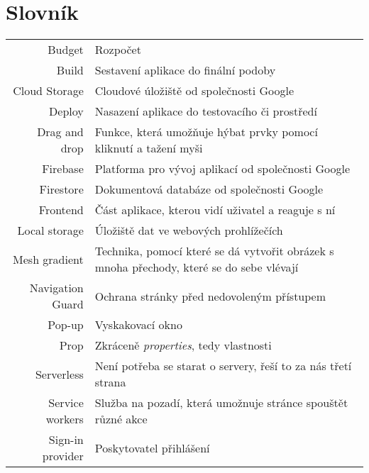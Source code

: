
\chapter{Slovník}

\begin{tabular}{rl}
    Budget & Rozpočet \\
    Build & Sestavení aplikace do finální podoby \\
    Cloud Storage & Cloudové úložiště od společnosti Google \\
    Deploy & Nasazení aplikace do testovacího či prostředí \\
    Drag and drop & Funkce, která umožňuje hýbat prvky pomocí kliknutí a tažení myši \\
    Firebase & Platforma pro vývoj aplikací od společnosti Google \\
    Firestore & Dokumentová databáze od společnosti Google \\
    Frontend & Část aplikace, kterou vidí uživatel a reaguje s ní \\
    Local storage & Úložiště dat ve webových prohlížečích \\
    Mesh gradient & Technika, pomocí které se dá vytvořit obrázek s mnoha přechody, které se do sebe vlévají \\
    Navigation Guard & Ochrana stránky před nedovoleným přístupem \\
    Pop-up & Vyskakovací okno \\
    Prop & Zkráceně \emph{properties}, tedy vlastnosti \\
    Serverless & Není potřeba se starat o servery, řeší to za nás třetí strana \\
    Service workers & Služba na pozadí, která umožnuje stránce spouštět různé akce \\
    Sign-in provider & Poskytovatel přihlášení \\
\end{tabular}
